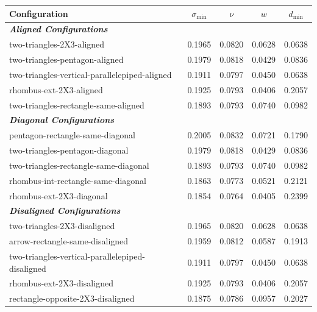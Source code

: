 \begin{table}[htbp]
\centering
\begin{threeparttable}
\begin{tabular}{lcccc}
\toprule
\textbf{Configuration} & $\sigma_{\min}$ \tnote{a} & $\nu$ \tnote{b} & $w$ \tnote{c} & $d_{\min}$ \tnote{d} \\
\midrule
\multicolumn{5}{l}{\textit{\textbf{Aligned Configurations}}} \\
\midrule
two-triangles-2X3-aligned                             & 0.1965 & 0.0820 & 0.0628 & 0.0638 \\
two-triangles-pentagon-aligned                        & 0.1979 & 0.0818 & 0.0429 & 0.0836 \\
two-triangles-vertical-parallelepiped-aligned         & 0.1911 & 0.0797 & 0.0450 & 0.0638 \\
rhombus-ext-2X3-aligned                               & 0.1925 & 0.0793 & 0.0406 & 0.2057 \\
two-triangles-rectangle-same-aligned                  & 0.1893 & 0.0793 & 0.0740 & 0.0982 \\
\midrule
\multicolumn{5}{l}{\textit{\textbf{Diagonal Configurations}}} \\
\midrule
pentagon-rectangle-same-diagonal                       & 0.2005 & 0.0832 & 0.0721 & 0.1790 \\
two-triangles-pentagon-diagonal                        & 0.1979 & 0.0818 & 0.0429 & 0.0836 \\
two-triangles-rectangle-same-diagonal                  & 0.1893 & 0.0793 & 0.0740 & 0.0982 \\
rhombus-int-rectangle-same-diagonal                    & 0.1863 & 0.0773 & 0.0521 & 0.2121 \\
rhombus-ext-2X3-diagonal                               & 0.1854 & 0.0764 & 0.0405 & 0.2399 \\
\midrule
\multicolumn{5}{l}{\textit{\textbf{Disaligned Configurations}}} \\
\midrule
two-triangles-2X3-disaligned                           & 0.1965 & 0.0820 & 0.0628 & 0.0638 \\
arrow-rectangle-same-disaligned                        & 0.1959 & 0.0812 & 0.0587 & 0.1913 \\
two-triangles-vertical-parallelepiped-disaligned       & 0.1911 & 0.0797 & 0.0450 & 0.0638 \\
rhombus-ext-2X3-disaligned                             & 0.1925 & 0.0793 & 0.0406 & 0.2057 \\
rectangle-opposite-2X3-disaligned                      & 0.1875 & 0.0786 & 0.0957 & 0.2027 \\

\end{tabular}
\end{threeparttable}
\end{table}
